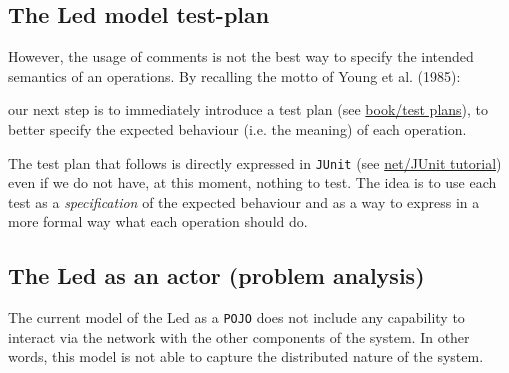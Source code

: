 

\subsection{The Led model test-plan}
However, the usage of comments is not the best way to specify the intended semantics of an operations.
By recalling the motto of Young et al. (1985):

\medskip 
\scriptsize
{}
\normalsize
\medskip 


our next step is to immediately introduce a test plan (see  \href{https://137.204.107.21/syskb/it.unibo.iss2015intro/docs/NatMolBook/content/book/modelBased/fasi/pianoCollaudo.html}{book/test plans}), to better specify the expected  behaviour (i.e. the meaning) of each operation.

The test plan that follows is directly expressed in \texttt{JUnit} (see 
\href{http://www.vogella.com/tutorials/JUnit/article.html}{net/JUnit tutorial}) even if we do not have, at this moment, nothing to test. The idea is to use each test as a \textit{specification} of the expected behaviour and as a way to express in a more formal way what each operation should do.




\subsection{The Led as an actor (problem analysis)}
The current model of the Led as a \texttt{POJO} does not include any capability to interact via the network  with the other components of the system. In other words, this model is not able to capture the distributed nature of the system.

